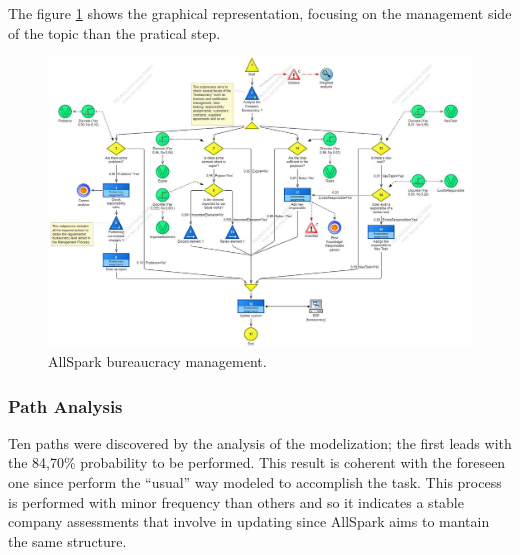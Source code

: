 The figure \ref{2img:bureaucracy} shows the graphical representation, focusing on the management side of the topic than the pratical step.\\

\begin{figure}[ht!]
\begin{centering}
\includegraphics[scale=0.35, angle=90]{assign2/adonis/imgs/bureaucracy.jpg}
\caption{AllSpark bureaucracy management.}
\label{2img:bureaucracy}
\end{centering}
\end{figure}


\subsubsection{Path Analysis}
Ten paths were discovered by the analysis of the modelization; the first leads with the 84,70\% probability to be performed. This result is coherent with the foreseen one since perform the ``usual'' way modeled to accomplish the task. This process is performed with minor frequency than others and so it indicates a stable company assessments that involve in updating since AllSpark aims to mantain the same structure.


